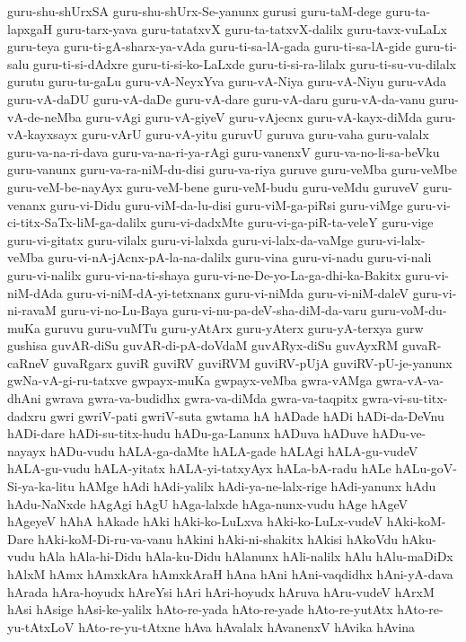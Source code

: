 {guru-shu-shUrxSA
guru-shu-shUrx-Se-yanunx
gurusi
guru-taM-dege
guru-ta-lapxgaH
guru-tarx-yava
guru-tatatxvX
guru-ta-tatxvX-dalilx
guru-tavx-vuLaLx
guru-teya
guru-ti-gA-sharx-ya-vAda
guru-ti-sa-lA-gada
guru-ti-sa-lA-gide
guru-ti-salu
guru-ti-si-dAdxre
guru-ti-si-ko-LaLxde
guru-ti-si-ra-lilalx
guru-ti-su-vu-dilalx
gurutu
guru-tu-gaLu
guru-vA-NeyxYva
guru-vA-Niya
guru-vA-Niyu
guru-vAda
guru-vA-daDU
guru-vA-daDe
guru-vA-dare
guru-vA-daru
guru-vA-da-vanu
guru-vA-de-neMba
guru-vAgi
guru-vA-giyeV
guru-vAjecnx
guru-vA-kayx-diMda
guru-vA-kayxsayx
guru-vArU
guru-vA-yitu
guruvU
guruva
guru-vaha
guru-valalx
guru-va-na-ri-dava
guru-va-na-ri-ya-rAgi
guru-vanenxV
guru-va-no-li-sa-beVku
guru-vanunx
guru-va-ra-niM-du-disi
guru-va-riya
guruve
guru-veMba
guru-veMbe
guru-veM-be-nayAyx
guru-veM-bene
guru-veM-budu
guru-veMdu
guruveV
guru-venanx
guru-vi-Didu
guru-viM-da-lu-disi
guru-viM-ga-piRsi
guru-viMge
guru-vi-ci-titx-SaTx-liM-ga-dalilx
guru-vi-dadxMte
guru-vi-ga-piR-ta-veleY
guru-vige
guru-vi-gitatx
guru-vilalx
guru-vi-lalxda
guru-vi-lalx-da-vaMge
guru-vi-lalx-veMba
guru-vi-nA-jAcnx-pA-la-na-dalilx
guru-vina
guru-vi-nadu
guru-vi-nali
guru-vi-nalilx
guru-vi-na-ti-shaya
guru-vi-ne-De-yo-La-ga-dhi-ka-Bakitx
guru-vi-niM-dAda
guru-vi-niM-dA-yi-tetxnanx
guru-vi-niMda
guru-vi-niM-daleV
guru-vi-ni-ravaM
guru-vi-no-Lu-Baya
guru-vi-nu-pa-deV-sha-diM-da-varu
guru-voM-du-muKa
guruvu
guru-vuMTu
guru-yAtArx
guru-yAterx
guru-yA-terxya
gurw
gushisa
guvAR-diSu
guvAR-di-pA-doVdaM
guvARyx-diSu
guvAyxRM
guvaR-caRneV
guvaRgarx
guviR
guviRV
guviRVM
guviRV-pUjA
guviRV-pU-je-yanunx
gwNa-vA-gi-ru-tatxve
gwpayx-muKa
gwpayx-veMba
gwra-vAMga
gwra-vA-va-dhAni
gwrava
gwra-va-budidhx
gwra-va-diMda
gwra-va-taqpitx
gwra-vi-su-titx-dadxru
gwri
gwriV-pati
gwriV-suta
gwtama
hA
hADade
hADi
hADi-da-DeVnu
hADi-dare
hADi-su-titx-hudu
hADu-ga-Lanunx
hADuva
hADuve
hADu-ve-nayayx
hADu-vudu
hALA-ga-daMte
hALA-gade
hALAgi
hALA-gu-vudeV
hALA-gu-vudu
hALA-yitatx
hALA-yi-tatxyAyx
hALa-bA-radu
hALe
hALu-goV-Si-ya-ka-litu
hAMge
hAdi
hAdi-yalilx
hAdi-ya-ne-lalx-rige
hAdi-yanunx
hAdu
hAdu-NaNxde
hAgAgi
hAgU
hAga-lalxde
hAga-nunx-vudu
hAge
hAgeV
hAgeyeV
hAhA
hAkade
hAki
hAki-ko-LuLxva
hAki-ko-LuLx-vudeV
hAki-koM-Dare
hAki-koM-Di-ru-va-vanu
hAkini
hAki-ni-shakitx
hAkisi
hAkoVdu
hAku-vudu
hAla
hAla-hi-Didu
hAla-ku-Didu
hAlanunx
hAli-nalilx
hAlu
hAlu-maDiDx
hAlxM
hAmx
hAmxkAra
hAmxkAraH
hAna
hAni
hAni-vaqdidhx
hAni-yA-dava
hArada
hAra-hoyudx
hAreYsi
hAri
hAri-hoyudx
hAruva
hAru-vudeV
hArxM
hAsi
hAsige
hAsi-ke-yalilx
hAto-re-yada
hAto-re-yade
hAto-re-yutAtx
hAto-re-yu-tAtxLoV
hAto-re-yu-tAtxne
hAva
hAvalalx
hAvanenxV
hAvika
hAvina
}

